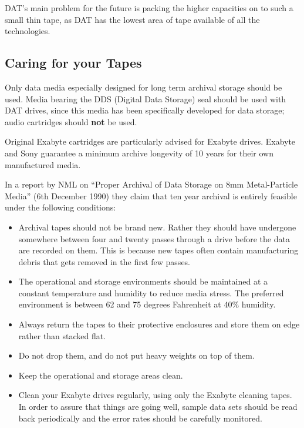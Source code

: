 DAT's main problem for the future is packing the higher capacities on to
such a small thin tape, as DAT has the lowest area of tape available of all
the technologies.

\subsection {Caring for your Tapes}

Only data media especially designed for long term archival storage should be
used. Media bearing the DDS (Digital Data Storage) seal should be used with DAT
drives, since this media has been specifically developed for data storage;
audio cartridges should {\bf not} be used.

Original Exabyte cartridges are particularly advised for Exabyte drives.
Exabyte and Sony guarantee a minimum archive longevity of 10 years for their
own manufactured media.

In a report by NML on ``Proper Archival of Data Storage on 8mm Metal-Particle
Media'' (6th December 1990) they claim that ten year archival is entirely
feasible under the following conditions:

\begin {itemize}

\item Archival tapes should not be brand new. Rather they should have
undergone somewhere between four and twenty passes through a drive before
the data are recorded on them. This is because new tapes often contain
manufacturing debris that gets removed in the first few passes.

\item The operational and storage environments should be maintained at a
constant temperature and humidity to reduce media stress. The preferred
environment is between 62 and 75 degrees Fahrenheit at 40\% humidity.

\item Always return the tapes to their protective enclosures and store them
on edge rather than stacked flat.

\item Do not drop them, and do not put heavy weights on top of them.

\item Keep the operational and storage areas clean.

\item Clean your Exabyte drives regularly, using only the Exabyte cleaning
tapes. In order to assure that things are going well, sample data sets
should be read back periodically and the error rates should be carefully
monitored.

\end {itemize}


